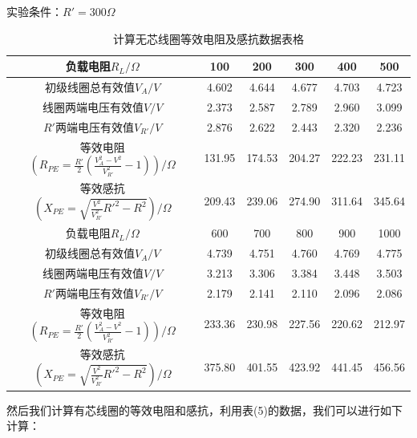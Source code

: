\documentclass[UTF8]{ctexart}
\begin{document}
        实验条件：$R'=300\Omega$
\begin{table}[H]\begin{center}
        \caption{计算无芯线圈等效电阻及感抗数据表格}
        \begin{tabular}{|c|c|c|c|c|c|}
            \hline
            \hline
        负载电阻$R_L/\Omega$&100&200&300&400&500\\

        \hline
        初级线圈总有效值$V_A/V$&4.602&4.644&4.677&4.703&4.723\\
        
        \hline
        线圈两端电压有效值$V/V$&2.373&2.587&2.789&2.960&3.099\\
        
        \hline
        $R'$两端电压有效值$V_{R'}/V$&2.876&2.622&2.443&2.320&2.236\\
        
        \hline
        等效电阻$(R_{PE}=\frac{R'}{2}(\frac{V_A^2-V^2}{V_{R'}^2}-1))/\Omega$&131.95&174.53&204.27&222.23&231.11\\
        \hline
        等效感抗$(X_{PE}=\sqrt{\frac{V^2}{V_{R'}^2}R'^2-R^2})/\Omega$&209.43&239.06&274.90&311.64&345.64\\
        \hline
        \hline

        负载电阻$R_L/\Omega$&600&700&800&900&1000\\
        \hline
        初级线圈总有效值$V_A/V$&4.739&4.751&4.760&4.769&4.775\\
        \hline
        线圈两端电压有效值$V/V$&3.213&3.306&3.384&3.448&3.503\\
        \hline
        $R'$两端电压有效值$V_{R'}/V$&2.179&2.141&2.110&2.096&2.086\\
        \hline
        等效电阻$(R_{PE}=\frac{R'}{2}(\frac{V_A^2-V^2}{V_{R'}^2}-1))/\Omega$&233.36&230.98&227.56&220.62&212.97\\
        \hline
        等效感抗$(X_{PE}=\sqrt{\frac{V^2}{V_{R'}^2}R'^2-R^2})/\Omega$&375.80&401.55&423.92&441.45&456.56\\
        \hline
        \end{tabular}
    \end{center}\end{table}
\vspace{-2em}
    然后我们计算有芯线圈的等效电阻和感抗，利用表(5)的数据，我们可以进行如下计算：
\end{document}
